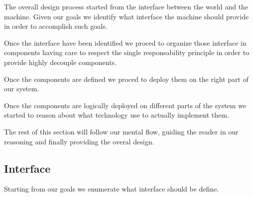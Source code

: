\documentclass[11pt]{article} %
\begin{document}
The overall design process started from the interface between the world and the machine. Given our goals we identify what interface the machine should provide in order to accomplish such goals.

Once the interface have been identified we proced to organize those interface in components having care to respect the single responsability principle in order to provide highly decouple components.

Once the components are defined we proced to deploy them on the right part of our system.

Once the components are logically deployed on different parts of the system we started to reason about what technology use to actually implement them.

The rest of this section will follow our mental flow, guiding the reader in our reasoning and finally providing the overal design.

\subsection{Interface}

Starting from our goals we enumerate what interface should be define.
\end{document}
